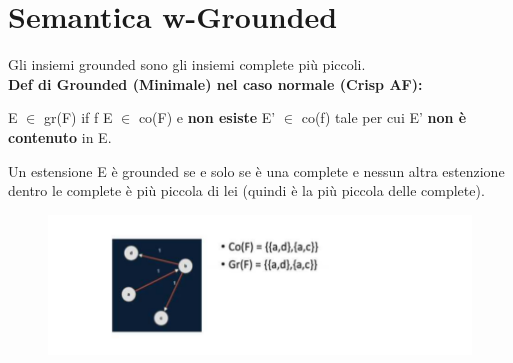     \section{Semantica w-Grounded}
    Gli insiemi grounded sono gli insiemi complete più piccoli.
    \\\textbf{Def di Grounded (Minimale) nel caso normale (Crisp AF):}
    \begin{center}
        E $\in$ gr(F) if f E $\in$ co(F) e \textbf{non esiste} E' $\in$ co(f) tale per cui E' \textbf{non è contenuto} in E.
    \end{center}
    Un estensione E è grounded se e solo se è una complete e nessun altra estenzione dentro le complete è più piccola di lei (quindi è la più piccola delle complete).
    \begin{figure}[H]
        \centering
        \includegraphics[width=12cm, keepaspectratio]{img/Cap6/w-grounded.png}
    \end{figure}

